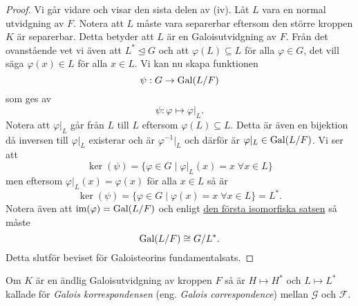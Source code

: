 \documentclass{article}
\newcommand{\im}[0]{\textnormal{im}}
\newcommand{\gal}[0]{\textnormal{Gal}}
\theoremstyle{definition}
\begin{document}
\begin{proof}
  Vi går vidare och visar den sista delen av (iv). Låt $L$ vara en normal utvidgning av $F$. Notera att $L$ måste vara separerbar eftersom 
  den större kroppen $K$ är separerbar. Detta betyder att $L$ är en Galoisutvidgning av $F$. Från det ovanstående vet vi även att 
  $L^* \trianglelefteq G$ och att $\varphi(L) \subseteq L$ för alla $\varphi \in G$, det vill säga $\varphi(x) \in L$ för alla $x \in L$.
  Vi kan nu skapa funktionen
  \[\psi: G \rightarrow \gal(L/F)\]
  som ges av 
  \[\psi: \varphi \mapsto \varphi|_L.\]
  Notera att $\varphi|_L$ går från $L$ till $L$ eftersom $\varphi(L) \subseteq L$. Detta är även en bijektion då inversen till $\varphi|_L$
  existerar och är $\varphi^{-1}|_L$ och därför är $\varphi|_L \in \gal(L/F)$. 
  Vi ser att 
  \[\ker (\psi) = \{\varphi \in G \; | \; \varphi|_L(x) = x \; \forall x \in L\}\]
  men eftersom $\varphi|_L(x) = \varphi(x)$ för alla $x \in L$ så är 
  \[\ker (\psi) = \{\varphi \in G \; | \; \varphi(x) = x \; \forall x \in L\} = L^*.\]
  Notera även att $\im(\varphi) = \gal(L/F)$ och enligt \hyperlink{isomorfiska}{den första isomorfiska satsen} så måste 
  \[\gal(L/F) \cong G/L^*.\]
  Detta slutför beviset för Galoisteorins fundamentalsats. 
\end{proof}

\begin{mydef}{}{}
  Om $K$ är en ändlig Galoisutvidgning av kroppen $F$ så är $H \mapsto H^*$ och $L \mapsto L^*$ kallade för \textit{Galois korrespondensen} 
  (eng. \textit{Galois correspondence}) mellan $\mathcal{G}$ och $\mathcal{F}$. 
\end{mydef}
\end{document}
